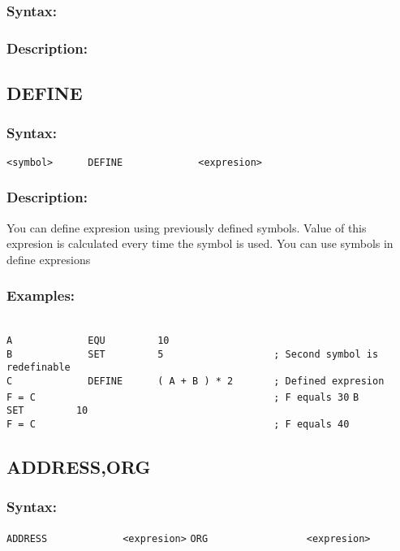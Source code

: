 {        \subsubsection{Syntax:}

        \subsubsection{Description:}

    \subsection{DEFINE}
        \subsubsection{Syntax:}
            \verb'<symbol>      DEFINE             <expresion>'

        \subsubsection{Description:}
        You can define expresion using previously defined symbols. Value of this expresion is calculated every time the symbol is used. You can use symbols in define expresions

        \subsubsection{Examples:}
        {
            ~\\
            \usecodefont
            \verb'A             EQU         10'\\
            \verb'B             SET         5                   ; Second symbol is redefinable'\\
            \verb'C             DEFINE      ( A + B ) * 2       ; Defined expresion'\\
            \verb'F = C                                         ; F equals 30'
            \verb'B             SET         10'\\
            \verb'F = C                                         ; F equals 40'
        }

    \subsection{ADDRESS,ORG}
        \subsubsection{Syntax:}
            \verb'ADDRESS             <expresion>'
            \verb'ORG                 <expresion>'

}
